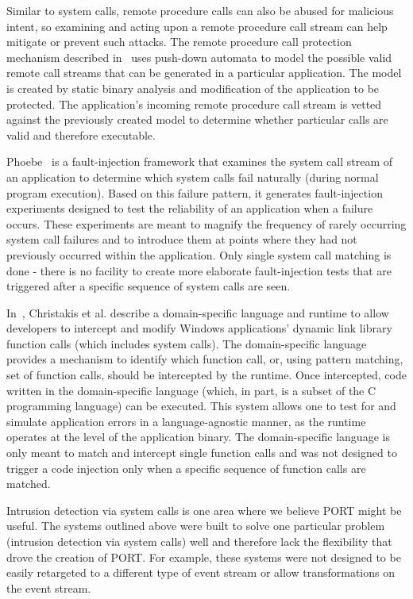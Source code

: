 Similar to system calls, remote procedure calls can also be abused for malicious
intent,
so examining and acting upon a remote procedure call stream can help mitigate or prevent such attacks.
The remote procedure call protection mechanism described in~\cite{DBLP:conf/uss/GiffinJM02} uses push-down automata to model the possible valid remote call streams that can be generated in a particular application.
The model is created by static binary analysis and modification of the application to be protected.
The application's incoming remote procedure call stream is vetted against the previously created model to determine whether particular calls are valid and therefore executable.

Phoebe~\cite{DBLP:journals/corr/abs-2006-04444} is a fault-injection framework
that examines the system call stream of an application to determine which system
calls fail naturally (during normal program execution). Based on this failure
pattern,
it generates fault-injection experiments designed to test the reliability of
an application when a failure occurs. These experiments are meant to magnify the
frequency of rarely occurring system call failures and to introduce them at
points where they had not previously occurred within the application.
Only single system call matching is done - there is no facility to create
more elaborate fault-injection tests that are triggered after a specific
sequence of system calls are seen.

In~\cite{DBLP:conf/icse/ChristakisEG017}, Christakis et al. describe a
domain-specific language and runtime to allow developers to intercept and modify
Windows applications’ dynamic link library function calls (which includes system
calls). The domain-specific language provides a mechanism to identify which
function call, or, using pattern matching, set of function calls, should be
intercepted by the runtime. Once intercepted, code written in the
domain-specific language (which, in part, is a subset of the C programming
language) can be executed. This system allows one to test for and simulate
application errors in a language-agnostic manner, as the runtime operates at the
level of the application binary. The domain-specific language is only meant to
match and intercept single function calls and was not designed to trigger a code
injection only when a specific sequence of function calls are matched.

Intrusion detection via system calls is one area where we believe PORT might be useful.
The systems outlined above were built to solve one particular problem (intrusion detection via system calls) well and
therefore lack the flexibility that drove the creation of PORT.
For example, these systems were not designed to be easily retargeted
to a different type of event stream or allow transformations on the event stream.


